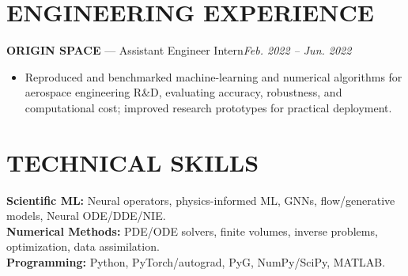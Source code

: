 \documentclass[11pt,letterpaper]{article}
\begin{document}
\section*{ENGINEERING EXPERIENCE}
\textbf{ORIGIN SPACE} --- Assistant Engineer Intern\hfill\textit{Feb. 2022 -- Jun. 2022}
\begin{itemize}
\item Reproduced and benchmarked machine-learning and numerical algorithms for aerospace engineering R\&D, evaluating accuracy, robustness, and computational cost; improved research prototypes for practical deployment.
\end{itemize}

\section*{TECHNICAL SKILLS}
\textbf{Scientific ML:} Neural operators, physics-informed ML, GNNs, flow/generative models, Neural ODE/DDE/NIE.\\
\textbf{Numerical Methods:} PDE/ODE solvers, finite volumes, inverse problems, optimization, data assimilation.\\
\textbf{Programming:} Python, PyTorch/autograd, PyG, NumPy/SciPy, MATLAB.
\end{document}
